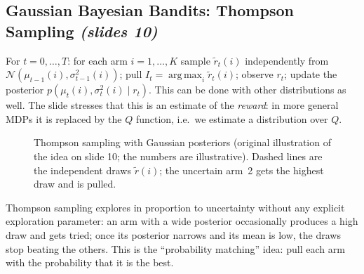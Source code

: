\documentclass[11pt,a4paper]{article}
\DeclareMathOperator*{\argmax}{arg\,max}
\newcommand{\slr}[1]{\texorpdfstring{\emph{(slides #1)}}{(slides #1)}}
\theoremstyle{plain}
\theoremstyle{definition}
\theoremstyle{remark}
\begin{document}
\subsection{Gaussian Bayesian Bandits: Thompson Sampling \slr{10}}
For $t=0,\dots,T$: for each arm $i=1,\dots,K$ sample $\tilde r_t(i)$ independently from $\mathcal N(\mu_{t-1}(i),\sigma^2_{t-1}(i))$; pull $I_t=\argmax_i\tilde r_t(i)$; observe $r_t$; update the posterior $p(\mu_t(i),\sigma_t^2(i)\mid r_t)$. This can be done with other distributions as well. The slide stresses that this is an estimate of the \emph{reward}: in more general MDPs it is replaced by the $Q$ function, i.e.\ we estimate a distribution over $Q$.

\begin{figure}[htbp]
\centering
{}
\caption{Thompson sampling with Gaussian posteriors (original illustration of the idea on slide 10; the numbers are illustrative). Dashed lines are the independent draws $\tilde r(i)$; the uncertain arm~2 gets the highest draw and is pulled.}
\end{figure}

\begin{intuition}
Thompson sampling explores in proportion to uncertainty without any explicit exploration parameter: an arm with a wide posterior occasionally produces a high draw and gets tried; once its posterior narrows and its mean is low, the draws stop beating the others. This is the ``probability matching'' idea: pull each arm with the probability that it is the best.
\end{intuition}

\end{document}
